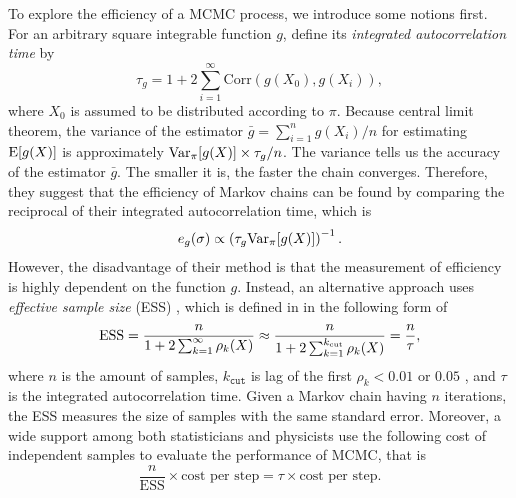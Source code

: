 To explore the efficiency of a MCMC process, we introduce some notions first. For an arbitrary square integrable function $g$, \cite{roberts2001optimal} define its \textit{integrated autocorrelation time} by 
\begin{equation*}
\tau_g = 1+ 2\sum_{i=1}^{\infty} \mathrm{Corr}\left( g(X_0),g(X_i) \right),
\end{equation*}
where $X_0$ is assumed to be distributed according to $\pi$. Because central limit theorem, the variance of the estimator $\bar{g} = \sum_{i=1}^{n}g(X_i)/n$ for estimating $\mathrm{E}\lbrack g(X) \rbrack$ is approximately $\mathrm{Var}_\pi\lbrack g(X)\rbrack \times \tau_g/n$. The variance tells us the accuracy of the estimator $\bar{g}$. The smaller it is, the faster the chain converges. Therefore, they suggest that the efficiency of Markov chains can be found by comparing the reciprocal of their integrated autocorrelation time, which is 
\begin{equation*}
e_g(\sigma)\propto \left(\tau_g\mathrm{Var}_\pi\lbrack g(X)\rbrack \right)^{-1}. 
\end{equation*}
However, the disadvantage of their method is that the measurement of efficiency is highly dependent on the function $g$. Instead, an alternative approach uses \textit{effective sample size} (ESS) \citep{kass1998markov, robert2004monte},  which is defined in \citep{gong2016practical} in the following form of  
\begin{equation*}
\mbox{ESS} =  \frac{n}{1+2\sum_{k=1}^{\infty}\rho_k(X)} \approx \frac{n}{1+2\sum_{k=1}^{k_\text{\tiny cut}}\rho_k(X)}= \frac{n}{\tau}, 
\end{equation*}
where $n$ is the amount of samples, $k_\mathtt{cut}$ is lag of the first $\rho_k<0.01$  or $0.05$ , and $\tau$ is the integrated autocorrelation time. Given a Markov chain having $n$ iterations, the ESS measures the size of \iid samples with the same standard error. Moreover, a wide support among both statisticians \citep{geyer1992practical} and physicists \citep{sokal1997monte} use the following cost of independent samples to evaluate the performance of MCMC, that is 
\begin{equation*}
\frac{n}{\mbox{ESS}}\times \mbox{cost per step} = \tau \times  \mbox{cost per step}.
\end{equation*} 

